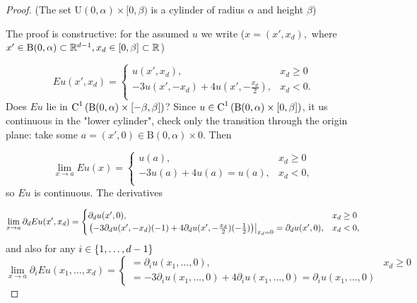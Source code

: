 \documentclass{article}
\begin{document}
\begin{proof}
	(The set $\text{U}(0,\alpha) \times [0,\beta)$ is a cylinder of radius $\alpha$ and height $\beta$)

	The proof is constructive: for the assumed $u$ we write ($x = (x',x_d),$ where $x' \in \text{B}(0,\alpha) \subset {\mathbb R}^{d-1}, x_d \in [0,\beta] \subset {\mathbb R}$)

	\begin{equation*}
		Eu(x',x_d) = 
		\begin{cases}
			u(x',x_d),& x_d \geq 0 \\
			-3u(x',-x_d) + 4u(x' ,-\frac{x_d}{2}) ,& x_d < 0.\\
		\end{cases}
	\end{equation*}
	Does $Eu$ lie in $\text{C}^{1}\!\,\left(\text{B}(0,\alpha)\times [-\beta, \beta] \right)$? Since $u \in \text{C}^{1}\!\,\left(\text{B}(0,\alpha)\times [0,\beta] \right)$, it us continuous in the "lower cylinder", check only the transition through the origin plane: take some $a=(x',0) \in \text{B}(0,\alpha)\times \qty{0}$. Then

	\begin{equation*}
		\lim_{x \to a} Eu(x) = 
		\begin{cases}
			u(a), & x_d \geq 0 \\
			-3u(a)+ 4u(a) = u(a), & x_d<0, \\
		\end{cases}
	\end{equation*}
	so $Eu$ is continuous. The derivatives 

	\begin{equation*}
		\lim_{x\to a}\partial_{d} Eu(x',x_d) = 
		\begin{cases}
			\partial_{d}u(x', 0) ,& x_d \geq 0 \\
			\eval{\qty(-3 \partial_{d} u (x',-x_d)(-1) + 4 \partial_{d}u(x',-\frac{x_d}{2}) (-\frac{1}{2}))}_{x_d = 0} = \partial_{d} u(x', 0),& x_d<0,\\
		\end{cases}
	\end{equation*}
	and also for any $i \in \qty{1, \dots, d-1}$ 
	\begin{equation*}
	  \lim_{x\to a}\partial_{i} Eu(x_1, \dots, x_d) = 
	  \begin{cases}
		  = \partial_{i} u (x_1, \dots, 0) , & x_d \geq 0 \\
		  = -3 \partial_{i} u(x_1, \dots, 0) + 4 \partial_{i} u(x_1, \dots, 0) = \partial_{i} u(x_1, \dots, 0)
	  \end{cases}
	\end{equation*}
	

\end{proof}
\end{document}

